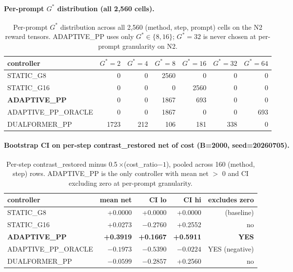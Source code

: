 \paragraph{Per-prompt $G^*$ distribution (all 2,560 cells).}

\begin{table}[ht]
\centering\small
\caption{Per-prompt $G^*$ distribution across all 2,560 (method, step, prompt)
cells on the N2 reward tensors. ADAPTIVE\_PP uses only $G^* \in \{8, 16\}$;
$G^*=32$ is never chosen at per-prompt granularity on N2.}
\label{tab:p7-iter131-gstar-dist}
\begin{tabular}{lrrrrrr}
\toprule
controller & $G^*=2$ & $G^*=4$ & $G^*=8$ & $G^*=16$ & $G^*=32$ & $G^*=64$ \\
\midrule
STATIC\_G8               & 0    & 0    & 2560 & 0    & 0    & 0    \\
STATIC\_G16              & 0    & 0    & 0    & 2560 & 0    & 0    \\
\textbf{ADAPTIVE\_PP}    & 0    & 0    & 1867 & 693  & 0    & 0    \\
ADAPTIVE\_PP\_ORACLE     & 0    & 0    & 1867 & 0    & 0    & 693  \\
DUALFORMER\_PP           & 1723 & 212  & 106  & 181  & 338  & 0    \\
\bottomrule
\end{tabular}
\end{table}

\paragraph{Bootstrap CI on per-step contrast\_restored net of cost
(B=2000, seed=20260705).}

\begin{table}[ht]
\centering\small
\caption{Per-step contrast\_restored minus 0.5\,$\times$(cost\_ratio$-1$),
pooled across 160 (method, step) rows. ADAPTIVE\_PP is the only controller
with mean net $>$ 0 and CI excluding zero at per-prompt granularity.}
\label{tab:p7-iter131-bootstrap-ci}
\begin{tabular}{lrrrr}
\toprule
controller & mean net & CI lo & CI hi & excludes zero \\
\midrule
STATIC\_G8               & +0.0000 & +0.0000 & +0.0000 & (baseline) \\
STATIC\_G16              & +0.0273 & $-0.2760$ & +0.2552 & no          \\
\textbf{ADAPTIVE\_PP}    & \textbf{+0.3919} & \textbf{+0.1667} & \textbf{+0.5911} & \textbf{YES} \\
ADAPTIVE\_PP\_ORACLE     & $-0.1973$ & $-0.5390$ & $-0.0224$ & YES (negative) \\
DUALFORMER\_PP           & $-0.0599$ & $-0.2857$ & +0.2560 & no \\
\bottomrule
\end{tabular}
\end{table}


